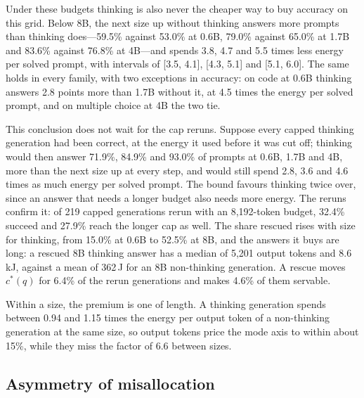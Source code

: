 \documentclass[final,5p,times,twocolumn]{elsarticle}
\theoremstyle{plain}
\newcommand{\cstar}{c^{*}}
\begin{document}
Under these budgets thinking is also never the cheaper way to buy accuracy on
this grid. Below 8B, the next size up without thinking answers more prompts
than thinking does---59.5\% against 53.0\% at 0.6B, 79.0\% against 65.0\% at
1.7B and 83.6\% against 76.8\% at 4B---and spends 3.8, 4.7 and 5.5 times less
energy per solved prompt, with intervals of [3.5, 4.1], [4.3, 5.1] and [5.1,
6.0]. The same holds in every family, with two exceptions in accuracy: on
code at 0.6B thinking answers 2.8 points more than 1.7B without it, at 4.5
times the energy per solved prompt, and on multiple choice at 4B the two tie.

This conclusion does not wait for the cap reruns. Suppose every capped
thinking generation had been correct, at the energy it used before it was cut
off; thinking would then answer 71.9\%, 84.9\% and 93.0\% of prompts at 0.6B,
1.7B and 4B, more than the next size up at every step, and would still spend
2.8, 3.6 and 4.6 times as much energy per solved prompt. The bound favours
thinking twice over, since an answer that needs a longer budget also needs
more energy. The reruns confirm it: of 219 capped generations rerun with an
8{,}192-token budget, 32.4\% succeed and 27.9\% reach the longer cap as well.
The share rescued rises with size for thinking, from 15.0\% at 0.6B to 52.5\%
at 8B, and the answers it buys are long: a rescued 8B thinking answer has a
median of 5{,}201 output tokens and 8.6\,kJ, against a mean of 362\,J for an
8B non-thinking generation. A rescue moves $\cstar(q)$ for 6.4\% of the rerun
generations and makes 4.6\% of them servable.

Within a size, the premium is one of length. A thinking generation spends
between 0.94 and 1.15 times the energy per output token of a non-thinking
generation at the same size, so output tokens price the mode axis to within
about 15\%, while they miss the factor of 6.6 between sizes.

\subsection{Asymmetry of misallocation}
\label{sec:results-asymmetry}
\end{document}
